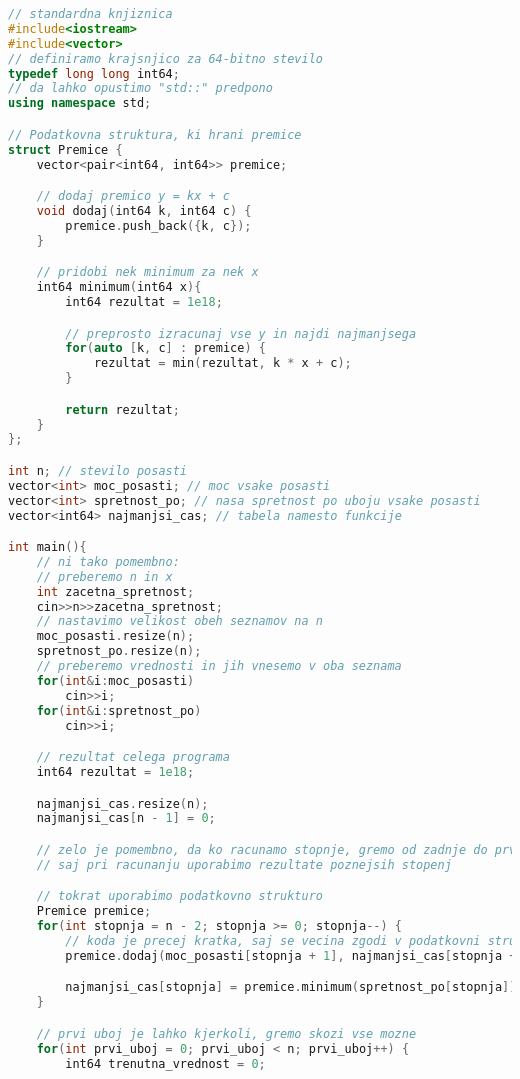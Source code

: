 \begin{lstlisting}[label={lst:code4}, language=C++]
// standardna knjiznica
#include<iostream>
#include<vector>
// definiramo krajsnjico za 64-bitno stevilo
typedef long long int64;
// da lahko opustimo "std::" predpono
using namespace std;

// Podatkovna struktura, ki hrani premice
struct Premice {
    vector<pair<int64, int64>> premice;

    // dodaj premico y = kx + c
    void dodaj(int64 k, int64 c) {
        premice.push_back({k, c});
    }

    // pridobi nek minimum za nek x
    int64 minimum(int64 x){
        int64 rezultat = 1e18;

        // preprosto izracunaj vse y in najdi najmanjsega
        for(auto [k, c] : premice) {
            rezultat = min(rezultat, k * x + c);
        }

        return rezultat;
    }
};

int n; // stevilo posasti
vector<int> moc_posasti; // moc vsake posasti
vector<int> spretnost_po; // nasa spretnost po uboju vsake posasti
vector<int64> najmanjsi_cas; // tabela namesto funkcije

int main(){
    // ni tako pomembno:
    // preberemo n in x
    int zacetna_spretnost;
    cin>>n>>zacetna_spretnost;
    // nastavimo velikost obeh seznamov na n
    moc_posasti.resize(n);
    spretnost_po.resize(n);
    // preberemo vrednosti in jih vnesemo v oba seznama
    for(int&i:moc_posasti)
        cin>>i;
    for(int&i:spretnost_po)
        cin>>i;

    // rezultat celega programa
    int64 rezultat = 1e18;

    najmanjsi_cas.resize(n);
    najmanjsi_cas[n - 1] = 0;

    // zelo je pomembno, da ko racunamo stopnje, gremo od zadnje do prve,
    // saj pri racunanju uporabimo rezultate poznejsih stopenj

    // tokrat uporabimo podatkovno strukturo
    Premice premice;
    for(int stopnja = n - 2; stopnja >= 0; stopnja--) {
        // koda je precej kratka, saj se vecina zgodi v podatkovni strukturi Premice
        premice.dodaj(moc_posasti[stopnja + 1], najmanjsi_cas[stopnja + 1]);

        najmanjsi_cas[stopnja] = premice.minimum(spretnost_po[stopnja]);
    }

    // prvi uboj je lahko kjerkoli, gremo skozi vse mozne
    for(int prvi_uboj = 0; prvi_uboj < n; prvi_uboj++) {
        int64 trenutna_vrednost = 0;


\end{lstlisting}
